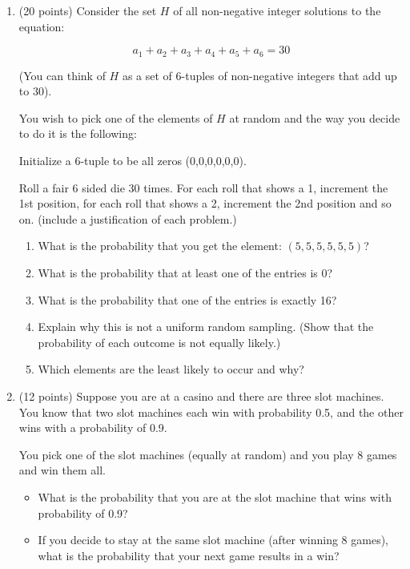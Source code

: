 \documentclass[10pt,letterpaper,unboxed,cm]{article}
\begin{document}
\begin{enumerate}


\item (20 points)
Consider the set $H$ of all non-negative integer solutions to the equation:

$$a_1 + a_2 + a_3 + a_4 + a_5 + a_6 = 30$$

(You can think of $H$ as a set of 6-tuples of non-negative integers that add up to 30).

You wish to pick one of the elements of $H$ at random and the way you decide to do it is the following:

Initialize a 6-tuple to be all zeros (0,0,0,0,0,0).

Roll a fair 6 sided die 30 times. For each roll that shows a 1, increment the 1st position, for each roll that shows a 2, increment the 2nd position and so on. (include a justification of each problem.)

\begin{enumerate}
\item
What is the probability that you get the element: $(5,5,5,5,5,5)$?
\item
What is the probability that at least one of the entries is $0$?
\item
What is the probability that one of the entries is exactly 16?
\item
Explain why this is not a uniform random sampling. (Show that the probability of each outcome is not equally likely.)
\item
Which elements are the least likely to occur and why?
\end{enumerate}




\item  (12 points)
Suppose you are at a casino and there are three slot machines. You know that two slot machines each win with probability 0.5, and the other wins with a probability of 0.9.

You pick one of the slot machines (equally at random) and you play 8 games and win them all.

\begin{itemize}
\item
What is the probability that you are at the slot machine that wins with probability of 0.9?

\item
If you decide to stay at the same slot machine (after winning 8 games), what is the probability that your next game results in a win?
\end{itemize}


\end{enumerate}
\end{document}
